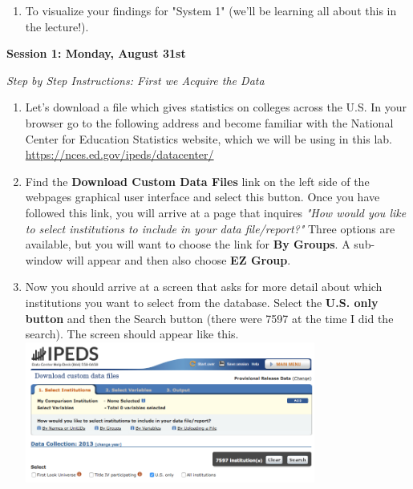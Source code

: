 \documentclass{article}
\begin{document}
{\begin{enumerate}[leftmargin=15mm]
\item To visualize your findings for "System 1" (we'll be learning all about this in the lecture!).

\end{enumerate}









\large{\textbf{Session 1: Monday, August 31st}}

\vspace{4mm}
\setlength{\leftskip}{1cm}
\textit{Step by Step Instructions: First we Acquire the Data}

\begin{enumerate}[leftmargin=15mm]

\item Let's download a file which gives statistics on colleges across the U.S.  In your browser go to the following address and become familiar with the National Center for Education Statistics website, which we will be using in this lab.\\ 
\url{https://nces.ed.gov/ipeds/datacenter/}

\item Find the \textbf{Download Custom Data Files} link on the left side of the webpages graphical user interface and select this button.  Once you have followed this link, you will arrive at a page that inquires \textit{"How would you like to select institutions to include in your data file/report?"}  Three options are available, but you will want to choose the link for \textbf{By Groups}.  A sub-window will appear and then also choose \textbf{EZ Group}.

\item Now you should arrive at a screen that asks for more detail about which institutions you want to select from the database.  Select the  \textbf{U.S. only button} and then the Search button (there were 7597 at the time I did the search).  The screen should appear like this. \includegraphics[width=0.75\textwidth]{us_only.png}


\end{enumerate}}
\end{document}
